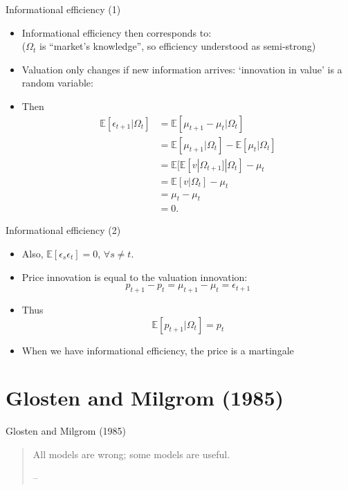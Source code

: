 \documentclass[english,10pt]{beamer}
\begin{document}
\begin{frame}{Informational efficiency (1)}
\begin{itemize}
	\item Informational efficiency then corresponds to: 
	\\
	($\Omega_t$ is ``market's knowledge'', so efficiency understood as semi-strong)
	\item Valuation only changes if new information arrives: `innovation in value' is a random variable: 
	\item Then
	\begin{align*}
		\mathbb{E}[\epsilon_{t+1}|\Omega_t] 
		& = \mathbb{E}[\mu_{t+1} - \mu_t|\Omega_t]\\
		& = \mathbb{E}[\mu_{t+1}|\Omega_t] - \mathbb{E}[\mu_t|\Omega_t]\\  
		& = \mathbb{E}[ \mathbb{E}[v|\Omega_{t+1}]|\Omega_t] - \mu_t\\  
		& = \mathbb{E}[v|\Omega_t] - \mu_t\\  
		& = \mu_t- \mu_t\\  
		& = 0.
	\end{align*}
\end{itemize}
\end{frame}


\begin{frame}{Informational efficiency (2)}
	\begin{itemize}
	 \item Also, $\mathbb{E}[\epsilon_{s}\epsilon_t]=0$, $\forall s \ne t$.
	\item Price innovation is equal to the valuation innovation:
	\[
	p_{t+1} - p_t = \mu_{t+1} - \mu_t = \epsilon_{t+1}
	\]
	\item Thus
	\[
	\mathbb{E}[p_{t+1}|\Omega_{t}] = p_t
	\]
	\item When we have informational efficiency, the price is a \alert{martingale}
\end{itemize}
\end{frame}



\section{Glosten and Milgrom (1985)}

\begin{frame}{Glosten and Milgrom (1985)}
	\begin{quotation}
		All models are wrong; some models are useful.
		\begin{flushright}
			-- 
		\end{flushright}
	\end{quotation}
\end{frame}
\end{document}
